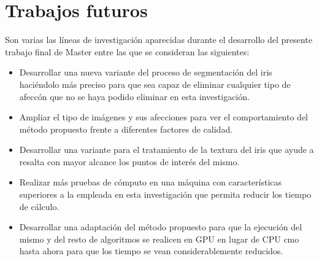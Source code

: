 \section{Trabajos futuros}
Son varias las líneas de investigación aparecidas durante el desarrollo del presente trabajo final de Master entre las que se consideran las siguientes:

\begin{itemize}
	 \item Desarrollar una nueva variante del proceso de segmentación del iris haciéndolo más preciso para que sea capaz de eliminar cualquier tipo de afeccón que no se haya podido eliminar en esta investigación. \\
	 
	 \item Ampliar el tipo de imágenes y sus afecciones para ver el comportamiento del método propuesto frente a diferentes factores de calidad.\\
	 
	  \item Desarrollar una variante para el tratamiento de la textura del iris que ayude a resalta con mayor alcance los puntos de interés del mismo.  \\
	  
	  \item Realizar más pruebas de cómputo en una máquina con características superiores a la empleada en esta investigación que permita reducir los tiempo de cálculo. \\
	  
	  \item Desarrollar una adaptación del método propuesto para que la ejecución del mismo y del resto de algoritmos se realicen en GPU en lugar de CPU cmo hasta ahora para que los tiempo se vean considerablemente reducidos.\\
\end{itemize} 


